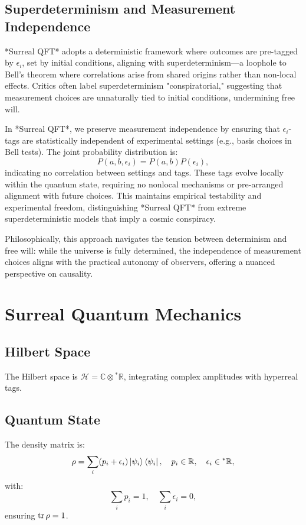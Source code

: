 \documentclass{article}
\begin{document}
\subsection{Superdeterminism and Measurement Independence}
*Surreal QFT* adopts a deterministic framework where outcomes are pre-tagged by \(\epsilon_i\), set by initial conditions, aligning with superdeterminism—a loophole to Bell's theorem where correlations arise from shared origins rather than non-local effects. Critics often label superdeterminism "conspiratorial," suggesting that measurement choices are unnaturally tied to initial conditions, undermining free will.

In *Surreal QFT*, we preserve measurement independence by ensuring that \(\epsilon_i\)-tags are statistically independent of experimental settings (e.g., basis choices in Bell tests). The joint probability distribution is:
\begin{equation}
P(a, b, \epsilon_i) = P(a, b) P(\epsilon_i),
\end{equation}
indicating no correlation between settings and tags. These tags evolve locally within the quantum state, requiring no nonlocal mechanisms or pre-arranged alignment with future choices. This maintains empirical testability and experimental freedom, distinguishing *Surreal QFT* from extreme superdeterministic models that imply a cosmic conspiracy.

Philosophically, this approach navigates the tension between determinism and free will: while the universe is fully determined, the independence of measurement choices aligns with the practical autonomy of observers, offering a nuanced perspective on causality.

\section{Surreal Quantum Mechanics}
\subsection{Hilbert Space}
The Hilbert space is \(\mathcal{H} = \mathbb{C} \otimes {}^*\mathbb{R}\), integrating complex amplitudes with hyperreal tags.

\subsection{Quantum State}
The density matrix is:
\begin{equation}
\rho = \sum_i (p_i + \epsilon_i) \ket{\psi_i}\bra{\psi_i}, \quad p_i \in \mathbb{R}, \quad \epsilon_i \in {}^*\mathbb{R},
\end{equation}
with:
\begin{equation}
\sum_i p_i = 1, \quad \sum_i \epsilon_i = 0,
\end{equation}
ensuring \(\tr \rho = 1\).
\end{document}
